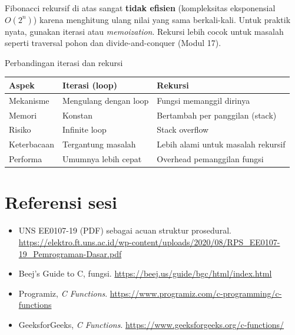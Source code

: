 \documentclass[../main.tex]{subfiles}
\begin{document}
\begin{catatan}
Fibonacci rekursif di atas sangat \textbf{tidak efisien} (kompleksitas eksponensial $O(2^n)$) karena menghitung ulang nilai yang sama berkali-kali. Untuk praktik nyata, gunakan iterasi atau \textit{memoization}. Rekursi lebih cocok untuk masalah seperti traversal pohon dan divide-and-conquer (Modul 17).
\end{catatan}

\begin{modultable}[]{Perbandingan iterasi dan rekursi}
{\small
\begin{tabular}{|>{\raggedright\arraybackslash}p{3.5cm}|>{\raggedright\arraybackslash}p{4.2cm}|>{\raggedright\arraybackslash}p{4.2cm}|}
\hline
\textbf{Aspek} & \textbf{Iterasi (loop)} & \textbf{Rekursi} \\
\hline
Mekanisme & Mengulang dengan loop & Fungsi memanggil dirinya \\
\hline
Memori & Konstan & Bertambah per panggilan (stack) \\
\hline
Risiko & Infinite loop & Stack overflow \\
\hline
Keterbacaan & Tergantung masalah & Lebih alami untuk masalah rekursif \\
\hline
Performa & Umumnya lebih cepat & Overhead pemanggilan fungsi \\
\hline
\end{tabular}
}
\end{modultable}

\section{Referensi sesi}
\begin{itemize}[leftmargin=*]
  \item UNS EE0107-19 (PDF) sebagai acuan struktur prosedural. \url{https://elektro.ft.uns.ac.id/wp-content/uploads/2020/08/RPS_EE0107-19_Pemrograman-Dasar.pdf}
  \item Beej's Guide to C, fungsi. \url{https://beej.us/guide/bgc/html/index.html}
  \item Programiz, \textit{C Functions}. \url{https://www.programiz.com/c-programming/c-functions}
  \item GeeksforGeeks, \textit{C Functions}. \url{https://www.geeksforgeeks.org/c-functions/}
\end{itemize}
\end{document}
